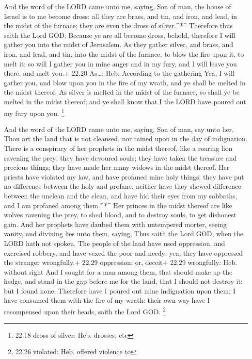  And the word of the LORD came unto me, saying,
 Son of man, the house of Israel is to me become dross: all
they are brass, and tin, and iron, and lead, in the midst of the
furnace; they are even the dross of silver.\^{}*\^{} 
Therefore thus saith the Lord GOD; Because ye are all become dross,
behold, therefore I will gather you into the midst of Jerusalem.
 As they gather silver, and brass, and iron, and lead, and
tin, into the midst of the furnace, to blow the fire upon it, to melt
it; so will I gather you in mine anger and in my fury, and I will leave
you there, and melt you.+ 22.20 As\ldots: Heb. According to the
gathering  Yea, I will gather you, and blow upon you in the
fire of my wrath, and ye shall be melted in the midst thereof.
 As silver is melted in the midst of the furnace, so shall
ye be melted in the midst thereof; and ye shall know that I the LORD
have poured out my fury upon you. \footnote{22.18 dross of silver: Heb.
  drosses, etc}

 And the word of the LORD came unto me, saying,
 Son of man, say unto her, Thou art the land that is not
cleansed, nor rained upon in the day of indignation.  There
is a conspiracy of her prophets in the midst thereof, like a roaring
lion ravening the prey; they have devoured souls; they have taken the
treasure and precious things; they have made her many widows in the
midst thereof.  Her priests have violated my law, and have
profaned mine holy things: they have put no difference between the holy
and profane, neither have they shewed difference between the unclean and
the clean, and have hid their eyes from my sabbaths, and I am profaned
among them.\^{}*\^{}  Her princes in the midst thereof are
like wolves ravening the prey, to shed blood, and to destroy souls, to
get dishonest gain.  And her prophets have daubed them with
untempered morter, seeing vanity, and divining lies unto them, saying,
Thus saith the Lord GOD, when the LORD hath not spoken. 
The people of the land have used oppression, and exercised robbery, and
have vexed the poor and needy: yea, they have oppressed the stranger
wrongfully.+ 22.29 oppression: or, deceit+ 22.29 wrongfully: Heb.
without right  And I sought for a man among them, that
should make up the hedge, and stand in the gap before me for the land,
that I should not destroy it: but I found none.  Therefore
have I poured out mine indignation upon them; I have consumed them with
the fire of my wrath: their own way have I recompensed upon their heads,
saith the Lord GOD. \footnote{22.26 violated: Heb. offered violence to}

